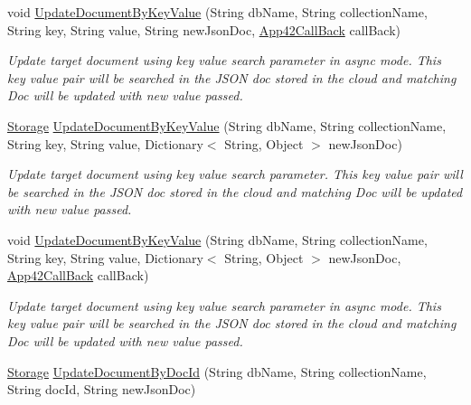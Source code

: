\begin{DoxyCompactItemize}
void \hyperlink{classcom_1_1shephertz_1_1app42_1_1paas_1_1sdk_1_1csharp_1_1storage_1_1_storage_service_a142571018a15b0c15c14ad8ff5607e53}{Update\+Document\+By\+Key\+Value} (String db\+Name, String collection\+Name, String key, String value, String new\+Json\+Doc, \hyperlink{interfacecom_1_1shephertz_1_1app42_1_1paas_1_1sdk_1_1csharp_1_1_app42_call_back}{App42\+Call\+Back} call\+Back)
\begin{DoxyCompactList}\small\item\em Update target document using key value search parameter in async mode. This key value pair will be searched in the J\+S\+O\+N doc stored in the cloud and matching Doc will be updated with new value passed. \end{DoxyCompactList}\item 
\hyperlink{classcom_1_1shephertz_1_1app42_1_1paas_1_1sdk_1_1csharp_1_1storage_1_1_storage}{Storage} \hyperlink{classcom_1_1shephertz_1_1app42_1_1paas_1_1sdk_1_1csharp_1_1storage_1_1_storage_service_ab797e20bd1e3db8a7042eac45fcc1afe}{Update\+Document\+By\+Key\+Value} (String db\+Name, String collection\+Name, String key, String value, Dictionary$<$ String, Object $>$ new\+Json\+Doc)
\begin{DoxyCompactList}\small\item\em Update target document using key value search parameter. This key value pair will be searched in the J\+S\+O\+N doc stored in the cloud and matching Doc will be updated with new value passed. \end{DoxyCompactList}\item 
void \hyperlink{classcom_1_1shephertz_1_1app42_1_1paas_1_1sdk_1_1csharp_1_1storage_1_1_storage_service_a6e1e868fb11a2bd20c6008c60326e29a}{Update\+Document\+By\+Key\+Value} (String db\+Name, String collection\+Name, String key, String value, Dictionary$<$ String, Object $>$ new\+Json\+Doc, \hyperlink{interfacecom_1_1shephertz_1_1app42_1_1paas_1_1sdk_1_1csharp_1_1_app42_call_back}{App42\+Call\+Back} call\+Back)
\begin{DoxyCompactList}\small\item\em Update target document using key value search parameter in async mode. This key value pair will be searched in the J\+S\+O\+N doc stored in the cloud and matching Doc will be updated with new value passed. \end{DoxyCompactList}\item 
\hyperlink{classcom_1_1shephertz_1_1app42_1_1paas_1_1sdk_1_1csharp_1_1storage_1_1_storage}{Storage} \hyperlink{classcom_1_1shephertz_1_1app42_1_1paas_1_1sdk_1_1csharp_1_1storage_1_1_storage_service_ac49e60b281704dd95e4a06ed540caf59}{Update\+Document\+By\+Doc\+Id} (String db\+Name, String collection\+Name, String doc\+Id, String new\+Json\+Doc)

\end{DoxyCompactItemize}
